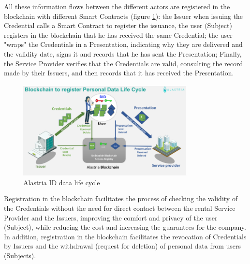 \documentclass[a4paper, 12pt]{article} %
\begin{document}
        All these information flows between the different actors are registered in the blockchain with different Smart Contracts (figure \ref{fig:rent-cycle}): the Issuer when issuing the Credential calls a Smart Contract to register the issuance, the user (Subject) registers in the blockchain that he has received the same Credential; the user "wraps" the Credentials in a Presentation, indicating why they are delivered and the validity date, signs it and records that he has sent the Presentation; Finally, the Service Provider verifies that the Credentials are valid, consulting the record made by their Issuers, and then records that it has received the Presentation.
        \begin{figure}[h]
            \centering
            \includegraphics[width=0.8\textwidth]{rent-car-data-lifecycle.png}
            \caption{Alastria ID data life cycle}
            \label{fig:rent-cycle}
        \end{figure}
        
        Registration in the blockchain facilitates the process of checking the validity of the Credentials without the need for direct contact between the rental Service Provider and the Issuers, improving the comfort and privacy of the user (Subject), while reducing the cost and increasing the guarantees for the company.\\

        In addition, registration in the blockchain facilitates the revocation of Credentials by Issuers and the withdrawal (request for deletion) of personal data from users (Subjects).
        
\end{document}
